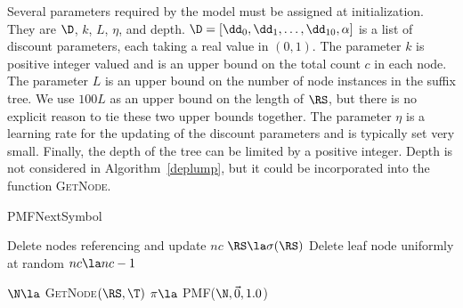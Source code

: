 Several parameters required by the model must be assigned at initialization.  They are $\D$, $k$, $L$, $\eta$,  and depth.  $\D = [\dd_0, \dd_1, \ldots, \dd_{10}, \alpha]$ is a list of discount parameters, each taking a real value in $(0,1)$.  The parameter $k$ is positive integer valued and is an upper bound on the total count $c$ in each node.  The parameter $L$ is an upper bound on the number of node instances in the suffix tree.  We use $100L$ as an upper bound on the length of $\RS$, but there is no explicit reason to tie these two upper bounds together. The parameter $\eta$ is a learning rate for the updating of the discount parameters and is typically set very small.  Finally, the depth of the tree can be limited by a positive integer.  Depth is not considered in Algorithm~\ref{deplump}, but it could be incorporated into the function \textsc{GetNode}.






\begin{algorithm}
	\caption{PMFNextSymbol} \label{alg:pmfnextsymbol}
	\begin{algorithmic}[1]
	
			\State Delete nodes referencing \RS[1] and update $nc$
			\State $\RS \la \sigma(\RS)$
		\EndWhile
			\State Delete leaf node uniformly at random
			\State $nc \la nc -1$
		\EndWhile
		
		\State $\N \la$ \textsc{GetNode}$(\RS, \T)$
		\State $\pi \la$ \textsc{PMF}($\N, \vec 0, 1.0$) 
		\State \Return [$\pi$, \N]
	\EndFunction
	
	 \end{algorithmic}

\end{algorithm}


